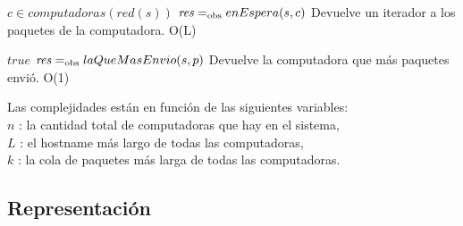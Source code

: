  {$c \in computadoras(red(s))$}
 {$\text{\textit{res}} =_{\mathrm{obs}} enEspera(s,c)$}
 {Devuelve un iterador a los paquetes de la computadora.}
 {O(L)}

 {$true$}
 {$\text{\textit{res}} =_{\mathrm{obs}} laQueMasEnvio(s,p)$}
 {Devuelve la computadora que más paquetes envió.}
 {O(1)}

Las complejidades están en función de las siguientes variables:\\
$n$ : la cantidad total de computadoras que hay en el sistema, \\
$L$ : el hostname más largo de todas las computadoras, \\
$k$ : la cola de paquetes más larga de todas las computadoras. 

\subsection{Representación}





